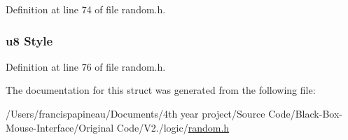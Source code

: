 \-Definition at line 74 of file random.\-h.

\hypertarget{structrandom_a0adf1bc45ebd31c75e1569a65ae60db4}{
\subsubsection[{\-Style}]{\setlength{\rightskip}{0pt plus 5cm}u8 {\bf \-Style}}}\label{structrandom_a0adf1bc45ebd31c75e1569a65ae60db4}


\-Definition at line 76 of file random.\-h.



\-The documentation for this struct was generated from the following file\-:\begin{DoxyCompactItemize}
\item 
/\-Users/francispapineau/\-Documents/4th year project/\-Source Code/\-Black-\/\-Box-\/\-Mouse-\/\-Interface/\-Original Code/\-V2./logic/\hyperlink{random_8h}{random.\-h}\end{DoxyCompactItemize}
